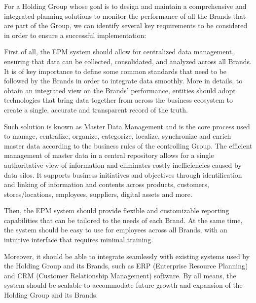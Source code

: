 \documentclass[12pt,a4paper,openright,twoside]{book}
\begin{document}
For a Holding Group whose goal is to design and maintain a comprehensive and integrated planning solutions to monitor the performance of all the Brands that are part of the Group, we can identify several key requirements to be considered in order to ensure a successful implementation:

First of all, the EPM system should allow for centralized data management, ensuring that data can be collected, consolidated, and analyzed across all Brands.
%
It is of key importance to define some common standards that need to be followed by the Brands in order to integrate data smoothly.
%
More in details, to obtain an integrated view on the Brands' performance, entities should adopt technologies that bring data together from across the business ecosystem to create a single, accurate and transparent record of the truth.

Such solution is known as Master Data Management and is the core process used to manage, centralize, organize, categorize, localize, synchronize and enrich master data according to the business rules of the controlling Group.
%
The efficient management of master data in a central repository allows for a single authoritative view of information and eliminates costly inefficiencies caused by data silos.
%
It supports business initiatives and objectives through identification and linking of information and contents across products, customers, stores/locations, employees, suppliers, digital assets and more.

Then, the EPM system should provide flexible and customizable reporting capabilities that can be tailored to the needs of each Brand.
%
At the same time, the system should be easy to use for employees across all Brands, with an intuitive interface that requires minimal training.

Moreover, it should be able to integrate seamlessly with existing systems used by the Holding Group and its Brands, such as ERP (Enterprise Resource Planning) and CRM (Customer Relationship Management) software.
%
By all means, the system should be scalable to accommodate future growth and expansion of the Holding Group and its Brands.
\end{document}

